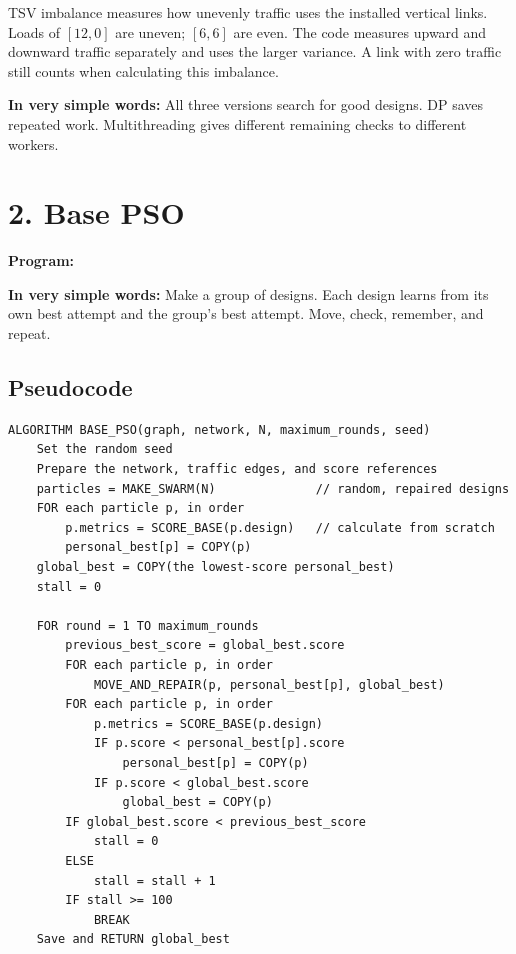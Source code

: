 \documentclass[11pt,a4paper]{article}
\newcommand{\simple}[1]{\textbf{In very simple words:} #1}
\begin{document}
TSV imbalance measures how unevenly traffic uses the installed vertical
links. Loads of $[12,0]$ are uneven; $[6,6]$ are even. The code measures upward
and downward traffic separately and uses the larger variance. A link with
zero traffic still counts when calculating this imbalance.

\simple{All three versions search for good designs. DP saves repeated work.
Multithreading gives different remaining checks to different workers.}

\clearpage
\section*{2. Base PSO}
\textbf{Program:} 

\simple{Make a group of designs. Each design learns from its own best attempt
and the group's best attempt. Move, check, remember, and repeat.}

\subsection*{Pseudocode}
\begin{lstlisting}
ALGORITHM BASE_PSO(graph, network, N, maximum_rounds, seed)
    Set the random seed
    Prepare the network, traffic edges, and score references
    particles = MAKE_SWARM(N)              // random, repaired designs
    FOR each particle p, in order
        p.metrics = SCORE_BASE(p.design)   // calculate from scratch
        personal_best[p] = COPY(p)
    global_best = COPY(the lowest-score personal_best)
    stall = 0

    FOR round = 1 TO maximum_rounds
        previous_best_score = global_best.score
        FOR each particle p, in order
            MOVE_AND_REPAIR(p, personal_best[p], global_best)
        FOR each particle p, in order
            p.metrics = SCORE_BASE(p.design)
            IF p.score < personal_best[p].score
                personal_best[p] = COPY(p)
            IF p.score < global_best.score
                global_best = COPY(p)
        IF global_best.score < previous_best_score
            stall = 0
        ELSE
            stall = stall + 1
        IF stall >= 100
            BREAK
    Save and RETURN global_best
\end{lstlisting}
\end{document}
